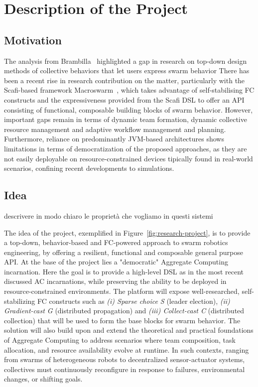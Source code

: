 \documentclass[12pt]{article}
\begin{document}
\section{Description of the Project}
\subsection{Motivation}
The analysis from Brambilla~\cite{brambilla2013swarm} highlighted a gap in research on top-down design methods of collective behaviors that let users express swarm behavior
There has been a recent rise in research contribution on the matter, 
particularly with the Scafi-based framework Macroswarm~\cite{aguzzi2023macroswarm}, which takes advantage of self-stabilising FC constructs and the expressiveness provided from the
Scafi DSL to offer an API consisting of functional, composable building blocks of swarm behavior.
However, important gaps remain in terms of dynamic team formation, dynamic collective resource management and adaptive workflow management and planning.
Furthermore, reliance on predominantly JVM-based architectures shows limitations in terms of democratization of the proposed approaches, as they are not easily deployable on resource-constrained devices tipically
found in real-world scenarios, confining recent developments to simulations.

\subsection{Idea}

descrivere in modo chiaro le proprietà che vogliamo in questi sistemi

The idea of the project, exemplified in Figure~\ref{fig:research-project}, is to provide a top-down, behavior-based and FC-powered approach to swarm robotics engineering, by offering a
resilient, functional and composable general purpose API.
At the base of the project lies a "democratic" Aggregate Computing incarnation. Here the goal is to provide a high-level DSL as in the most recent discussed AC incarnations,
while preserving the ability to be deployed in resource-constrained environments. The platform will expose well-researched, self-stabilizing FC constructs such as
\textit{(i) Sparse choice S} (leader election), \textit{(ii) Gradient-cast G} (distributed propagation) and \textit{(iii) Collect-cast C} (distributed collection) that will be used to form
the base blocks for swarm behavior. The solution will also build upon and extend the theoretical and practical foundations of Aggregate Computing to address scenarios where team composition, 
task allocation, and resource availability evolve at runtime. In such contexts, ranging from swarms of heterogeneous robots to decentralized sensor-actuator 
systems, collectives must continuously reconfigure in response to failures, environmental changes, or shifting goals.
\end{document}
